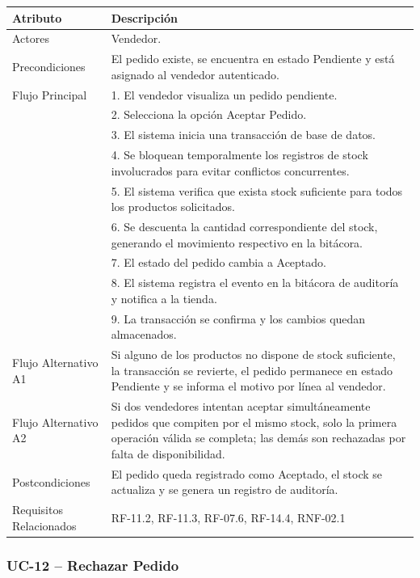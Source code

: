\documentclass[12pt,a4paper]{report}
\begin{document}
\begin{longtable}{|p{4cm}|p{10cm}|}
\hline
\textbf{Atributo} & \textbf{Descripción} \\ \hline
Actores & Vendedor. \\ \hline
Precondiciones & El pedido existe, se encuentra en estado Pendiente y está asignado al vendedor autenticado. \\ \hline
Flujo Principal &
1. El vendedor visualiza un pedido pendiente.\\
& 2. Selecciona la opción Aceptar Pedido.\\
& 3. El sistema inicia una transacción de base de datos.\\
& 4. Se bloquean temporalmente los registros de stock involucrados para evitar conflictos concurrentes.\\
& 5. El sistema verifica que exista stock suficiente para todos los productos solicitados.\\
& 6. Se descuenta la cantidad correspondiente del stock, generando el movimiento respectivo en la bitácora.\\
& 7. El estado del pedido cambia a Aceptado.\\
& 8. El sistema registra el evento en la bitácora de auditoría y notifica a la tienda.\\
& 9. La transacción se confirma y los cambios quedan almacenados. \\ \hline
Flujo Alternativo A1 & Si alguno de los productos no dispone de stock suficiente, la transacción se revierte, el pedido permanece en estado Pendiente y se informa el motivo por línea al vendedor. \\ \hline
Flujo Alternativo A2 & Si dos vendedores intentan aceptar simultáneamente pedidos que compiten por el mismo stock, solo la primera operación válida se completa; las demás son rechazadas por falta de disponibilidad. \\ \hline
Postcondiciones & El pedido queda registrado como Aceptado, el stock se actualiza y se genera un registro de auditoría. \\ \hline
Requisitos Relacionados & RF-11.2, RF-11.3, RF-07.6, RF-14.4, RNF-02.1 \\ \hline
\end{longtable}


\subsubsection{UC-12 -- Rechazar Pedido}
\end{document}
